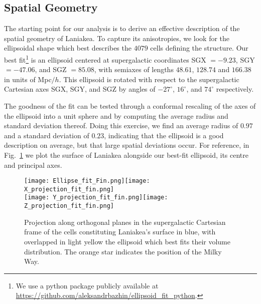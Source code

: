 \documentclass[notitlepage,nofootinbib]{revtex4-1}
\begin{document}

\subsection{Spatial Geometry}

\label{bestfitellipsoid}

The starting point for our analysis is to derive an effective description of the spatial geometry of Laniakea. To capture its anisotropies, we look for the ellipsoidal shape which best describes  the $4079$ cells defining the structure. 
Our best fit\footnote{We use a python package publicly available at \href{https://github.com/aleksandrbazhin/ellipsoid_fit_python}{https://github.com/aleksandrbazhin/ellipsoid\_fit\_python}.} is  an ellipsoid centered at supergalactic coordinates SGX $= -9.23$, SGY $= -47.06$, and SGZ $=85.08$, with semiaxes of lengths $48.61$, $128.74$ and $166.38$ in units of Mpc$/h$.
This ellipsoid is rotated with respect to the supergalactic Cartesian axes SGX, SGY, and SGZ by angles of $ -27^\circ$, $ 16^\circ$, and $74^\circ$ respectively. 

The goodness of the fit can be tested through a conformal rescaling of the axes of the ellipsoid into a unit sphere and by computing the average radius and standard deviation thereof. Doing this exercise, we find an average radius of $0.97$ and a standard deviation of $0.23$, indicating that the ellipsoid is a good description on average, but that large spatial deviations occur. For reference, in Fig.~\ref{Ellipsfit} we plot the surface of Laniakea alongside our best-fit ellipsoid, its centre and principal axes.

\begin{figure}[!tbp]
    \centering
    \texttt{[image: Ellipse\_fit\_Fin.png]}\texttt{[image: X\_projection\_fit\_fin.png]}\\
 \texttt{[image: Y\_projection\_fit\_fin.png]}\texttt{[image: Z\_projection\_fit\_fin.png]}\\
	\caption{Projection along orthogonal planes in the supergalactic Cartesian frame of the cells constituting Laniakea's surface in blue, with overlapped in light yellow the ellipsoid which best fits their volume distribution. The orange star indicates the position of the Milky Way.}
	\label{Ellipsfit}
\end{figure}

\end{document}
